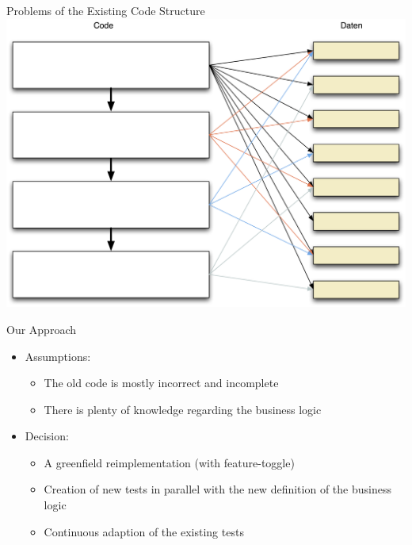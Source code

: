 \begin{frame}[fragile]{Problems of the Existing Code Structure}
\includegraphics[width=.85 \paperwidth]{Codestruktur.png}
\end{frame}

\begin{frame}[fragile]{Our Approach}
\begin{itemize}
\item Assumptions:
\begin{itemize}
\item The old code is mostly incorrect and incomplete
\item There is plenty of knowledge regarding the business logic
\end{itemize}
\end{itemize}

\begin{itemize}
\item Decision:
\begin{itemize}
\item A greenfield reimplementation (with feature-toggle)
\item Creation of new tests in parallel with the new definition of the business logic
\item Continuous adaption of the existing tests
\end{itemize}
\end{itemize}

\end{frame}


